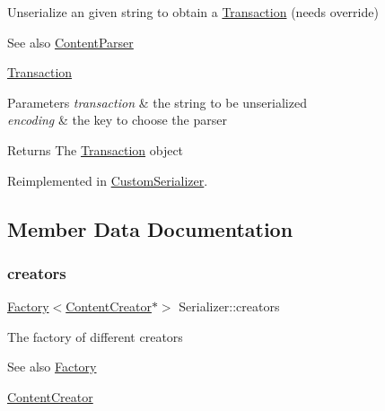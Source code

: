 Unserialize an given string to obtain a \mbox{\hyperlink{classTransaction}{Transaction}} (needs override) \begin{DoxySeeAlso}{See also}
\mbox{\hyperlink{classContentParser}{Content\+Parser}} 

\mbox{\hyperlink{classTransaction}{Transaction}}
\end{DoxySeeAlso}

\begin{DoxyParams}{Parameters}
{\em transaction} & the string to be unserialized \\
\hline
{\em encoding} & the key to choose the parser \\
\hline
\end{DoxyParams}
\begin{DoxyReturn}{Returns}
The \mbox{\hyperlink{classTransaction}{Transaction}} object 
\end{DoxyReturn}


Reimplemented in \mbox{\hyperlink{classCustomSerializer_abff58f1a955c2f399127b7e3cae23223}{Custom\+Serializer}}.



\subsection{Member Data Documentation}
\mbox{\label{classSerializer_a7d26e865966b304350653b1246ec3340}} 
\subsubsection{\texorpdfstring{creators}{creators}}
{\footnotesize\ttfamily \mbox{\hyperlink{classFactory}{Factory}}$<$\mbox{\hyperlink{classContentCreator}{Content\+Creator}}$\ast$$>$ Serializer\+::creators\hspace{0.3cm}{\ttfamily [protected]}}

The factory of different creators \begin{DoxySeeAlso}{See also}
\mbox{\hyperlink{classFactory}{Factory}} 

\mbox{\hyperlink{classContentCreator}{Content\+Creator}} 
\end{DoxySeeAlso}
\mbox{\label{classSerializer_a96f96c01e6a471513669621751591fd9}} 
